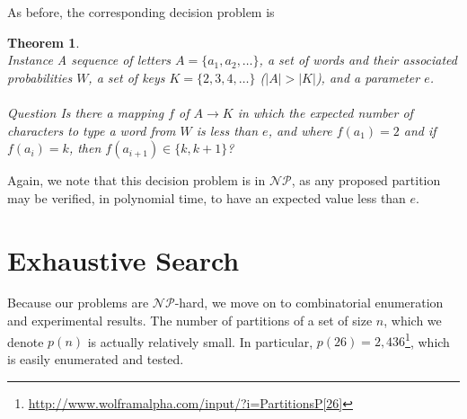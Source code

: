 \documentclass{article}
\newtheorem{theorem}{Theorem}
\newcommand{\NP}{\ensuremath{\mathcal{NP}}}
\begin{document}
As before, the corresponding decision problem is
\begin{theorem}~\\
{\sc Instance} A sequence of letters $A = \{a_1, a_2, \ldots \}$, a set of words and their associated probabilities $W$, a set of keys $K = \{2, 3, 4, \ldots \}$ ($|A| > |K|$), and a parameter $e$.\\
~\\
{\sc Question} Is there a mapping $f$ of $A \to K$ in which the expected number of characters to type a word from $W$ is less than $e$, and where $f(a_1) = 2$ and if $f(a_i) = k$, then $f(a_{i+1}) \in \{k, k+1\}$?
\end{theorem}

Again, we note that this decision problem is in \NP, as any proposed partition may be verified, in polynomial time, to have an expected value less than $e$.

\section{Exhaustive Search}

Because our problems are \NP-hard, we move on to combinatorial enumeration and experimental results.  The number of partitions of a set of size $n$, which we denote $p(n)$ is actually relatively small.  In particular, $p(26) = 2,436$\footnote{\url{http://www.wolframalpha.com/input/?i=PartitionsP[26]}}, which is easily enumerated and tested.
\end{document}
